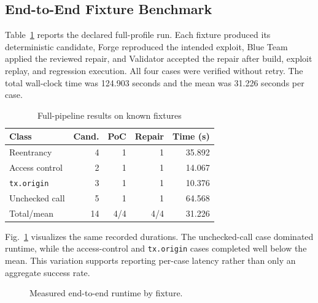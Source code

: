 \documentclass[conference,a4paper,10pt]{IEEEtran}
\newcommand{\code}[1]{\texttt{#1}}
\begin{document}
\subsection{End-to-End Fixture Benchmark}
Table~\ref{tab:results} reports the declared full-profile run. Each fixture produced its deterministic candidate, Forge reproduced the intended exploit, Blue Team applied the reviewed repair, and Validator accepted the repair after build, exploit replay, and regression execution. All four cases were verified without retry. The total wall-clock time was 124.903 seconds and the mean was 31.226 seconds per case.

\begin{table}[t]
\caption{Full-pipeline results on known fixtures}
\label{tab:results}
\centering\footnotesize
\begin{tabular}{@{}lrrrr@{}}
\toprule
Class & Cand. & PoC & Repair & Time (s)\\
\midrule
Reentrancy & 4 & 1 & 1 & 35.892\\
Access control & 2 & 1 & 1 & 14.067\\
\code{tx.origin} & 3 & 1 & 1 & 10.376\\
Unchecked call & 5 & 1 & 1 & 64.568\\
\midrule
Total/mean & 14 & 4/4 & 4/4 & 31.226\\
\bottomrule
\end{tabular}
\end{table}

Fig.~\ref{fig:runtime} visualizes the same recorded durations. The unchecked-call case dominated runtime, while the access-control and \code{tx.origin} cases completed well below the mean. This variation supports reporting per-case latency rather than only an aggregate success rate.

\begin{figure}[t]
\centering
{}
\caption{Measured end-to-end runtime by fixture.}
\label{fig:runtime}
\end{figure}
\end{document}
